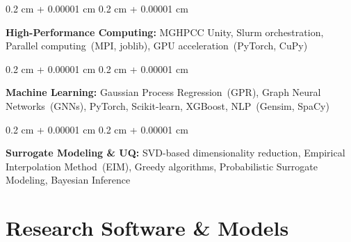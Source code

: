 \documentclass[10pt, letterpaper]{article}
\newenvironment{onecolentry}{
    \begin{adjustwidth}{
        0.2 cm + 0.00001 cm
    }{
        0.2 cm + 0.00001 cm
    }
}{
    \end{adjustwidth}
}
\begin{document}
\begin{onecolentry}
  \textbf{High-Performance Computing:} MGHPCC Unity, Slurm orchestration, Parallel computing~(MPI, joblib), 
  GPU acceleration~(PyTorch, CuPy)
\end{onecolentry}

\vspace{0.2 cm}

\begin{onecolentry}
  \textbf{Machine Learning:} Gaussian Process Regression~(GPR), Graph Neural Networks~(GNNs), PyTorch, Scikit-learn, 
  XGBoost, NLP~(Gensim, SpaCy)
\end{onecolentry}

\vspace{0.2 cm}

\begin{onecolentry}
  \textbf{Surrogate Modeling \& UQ:} SVD-based dimensionality reduction, 
  Empirical Interpolation Method~(EIM), Greedy algorithms, Probabilistic Surrogate Modeling, Bayesian Inference
\end{onecolentry}



\section{Research Software \& Models}
\end{document}
